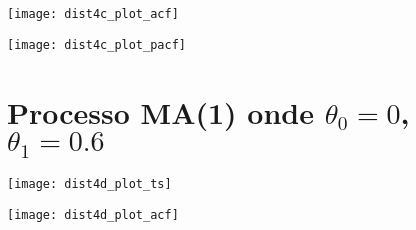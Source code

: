 \begin{center}
\begin{centering}
\texttt{[image: dist4c\_plot\_acf]}
\par\end{centering}
\par\end{center}

\begin{center}
\begin{centering}
\texttt{[image: dist4c\_plot\_pacf]}
\par\end{centering}
\par\end{center}


\section{Processo MA(1) onde $\theta_{0}=0$, $\theta_{1}=0.6$}

\begin{center}
\begin{centering}
\texttt{[image: dist4d\_plot\_ts]}
\par\end{centering}
\par\end{center}


\begin{center}
\begin{centering}
\texttt{[image: dist4d\_plot\_acf]}
\par\end{centering}
\par\end{center}

